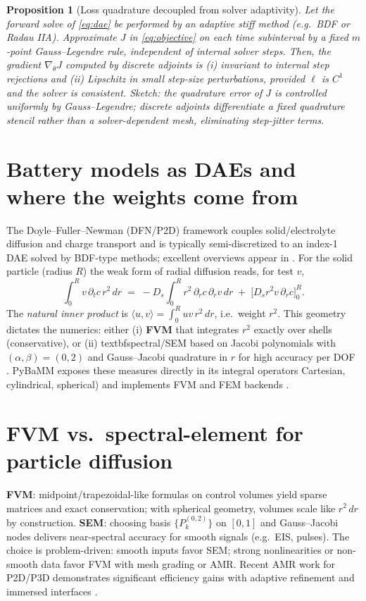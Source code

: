 \documentclass[11pt]{article}
\newtheorem{proposition}{Proposition}
\begin{document}
\begin{proposition}[Loss quadrature decoupled from solver adaptivity]\label{prop:loss}
Let the forward solve of \eqref{eq:dae} be performed by an adaptive stiff method (e.g.\ BDF or Radau IIA). Approximate
$J$ in \eqref{eq:objective} on each time subinterval by a \emph{fixed} $m$-point Gauss--Legendre rule, independent of
internal solver steps. Then, the gradient $\nabla_\theta J$ computed by discrete adjoints is (i) invariant to internal
step rejections and (ii) Lipschitz in small step-size perturbations, provided $\ell$ is $C^1$ and the solver is
consistent. \emph{Sketch:} the quadrature error of $J$ is controlled uniformly by Gauss--Legendre; discrete adjoints
differentiate a fixed quadrature stencil rather than a solver-dependent mesh, eliminating step-jitter terms.
\end{proposition}

\section{Battery models as DAEs and where the weights come from}
The Doyle--Fuller--Newman (DFN/P2D) framework couples solid/electrolyte diffusion and charge transport and is
typically semi-discretized to an index-1 DAE solved by BDF-type methods; excellent overviews appear in \cite{chenrevie
,bizerayUQ,smithMET,drummondDFN}. For the solid particle (radius $R$) the weak form of radial diffusion reads, for test $v$,
\begin{equation}
\int_0^R v\,\partial_t c\, r^2\,dr \;=\; -D_s\int_0^R r^2 \,\partial_r c\,\partial_r v\,dr \;+\; \big[D_s r^2 v\,\partial_r c\big]_0^R.
\end{equation}
The \emph{natural inner product} is $\langle u,v\rangle=\int_0^R u v\,r^2\,dr$, i.e.\ weight $r^2$. This geometry
dictates the numerics: either (i) \textbf{FVM} that integrates $r^2$ exactly over shells (conservative), or (ii) 
textbf{spectral/SEM} based on Jacobi polynomials with $(\alpha,\beta)=(0,2)$ and Gauss--Jacobi quadrature in $r$ for
high accuracy per DOF \cite{trefethen,guoshen}. PyBaMM exposes these measures directly in its integral operators 
Cartesian, cylindrical, spherical) and implements FVM and FEM backends \cite{pybammunary,pybammspatial}.

\section{FVM vs.\ spectral-element for particle diffusion}
\textbf{FVM}: midpoint/trapezoidal-like formulas on control volumes yield sparse matrices and exact conservation; with
spherical geometry, volumes scale like $r^2\,dr$ by construction.
\textbf{SEM}: choosing basis $\{P_k^{(0,2)}\}$ on $[0,1]$ and Gauss--Jacobi nodes delivers near-spectral accuracy for
smooth signals (e.g.\ EIS, pulses). The choice is problem-driven:
smooth inputs favor SEM; strong nonlinearities or non-smooth data favor FVM with mesh grading or AMR. Recent AMR work
for P2D/P3D demonstrates significant efficiency gains with adaptive refinement and immersed interfaces \cite{amrJAP1,amrJAP2}.
\end{document}
